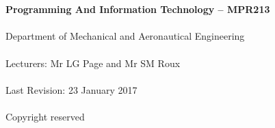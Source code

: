\begin{titlepage}
    \thispagestyle{empty}
    \\~\\[18cm]
    \large
    \textbf{Programming And Information Technology -- MPR213} \\~\\
    Department of Mechanical and Aeronautical Engineering \\~\\[0.5cm]
    \normalsize
    Lecturers: Mr LG Page and  Mr SM Roux \\~\\
    Last Revision: 23 January 2017 \\~\\[0.5em]
    \textcopyright \quad Copyright reserved \\~\\
\end{titlepage}
\restoregeometry
